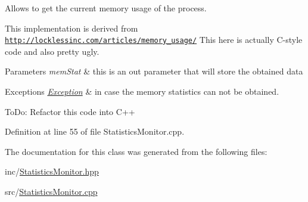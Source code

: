 Allows to get the current memory usage of the process. 

This implementation is derived from \href{http://locklessinc.com/articles/memory_usage/}{\tt http\+://locklessinc.\+com/articles/memory\+\_\+usage/} This here is actually C-\/style code and also pretty ugly.


\begin{DoxyParams}{Parameters}
{\em mem\+Stat} & this is an out parameter that will store the obtained data \\
\hline
\end{DoxyParams}

\begin{DoxyExceptions}{Exceptions}
{\em \hyperlink{class_exception}{Exception}} & in case the memory statistics can not be obtained.\\
\hline
\end{DoxyExceptions}
To\+Do\+: Refactor this code into C++ 

Definition at line 55 of file Statistics\+Monitor.\+cpp.



The documentation for this class was generated from the following files\+:\begin{DoxyCompactItemize}
\item 
inc/\hyperlink{_statistics_monitor_8hpp}{Statistics\+Monitor.\+hpp}\item 
src/\hyperlink{_statistics_monitor_8cpp}{Statistics\+Monitor.\+cpp}\end{DoxyCompactItemize}
